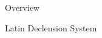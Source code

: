 \documentclass[final]{beamer}
\newlength{\onecolwid}
\begin{document}
\begin{frame}[t]
\begin{columns}[t]
\begin{column}{\onecolwid}
\begin{alertblock}{Overview}


\end{alertblock}


\begin{block}{Latin Declension System}


\end{block}
\end{column}
\end{columns}
\end{frame}
\end{document}
